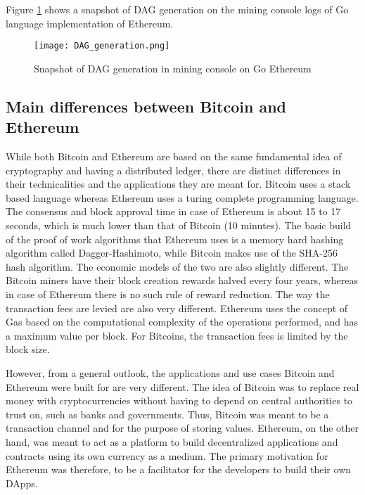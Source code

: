 \documentclass[english]{tktltiki}
\begin{document}
Figure \ref{DAG_generation} shows a snapshot of DAG generation on the mining console logs of Go language implementation of Ethereum.

\begin{figure}[H]
\begin{center}
\texttt{[image: DAG\_generation.png]}
\caption{Snapshot of DAG generation in mining console on Go Ethereum}
\label{DAG_generation}
\end{center}
\end{figure}

\subsection{Main differences between Bitcoin and Ethereum}

While both Bitcoin and Ethereum are based on the same fundamental idea of cryptography and having a distributed ledger, there are distinct differences in their technicalities and the applications they are meant for. Bitcoin uses a stack based language whereas Ethereum uses a turing complete programming language. The consensus and block approval time in case of Ethereum is about 15 to 17 seconds, which is much lower than that of Bitcoin (10 minutes). The basic build of the proof of work algorithms that Ethereum uses is a memory hard hashing algorithm called Dagger-Hashimoto, while Bitcoin makes use of the SHA-256 hash algorithm. The economic models of the two are also slightly different. The Bitcoin miners have their block creation rewards halved every four years, whereas in case of Ethereum there is no such rule of reward reduction. The way the transaction fees are levied are also very different. Ethereum uses the concept of Gas based on the computational complexity of the operations performed, and has a maximum value per block. For Bitcoins, the transaction fees is limited by the block size.

However, from a general outlook, the applications and use cases Bitcoin and Ethereum were built for are very different. The idea of Bitcoin was to replace real money with cryptocurrencies without having to depend on central authorities to trust on, such as banks and governments. Thus, Bitcoin was meant to be a transaction channel and for the purpose of storing values. Ethereum, on the other hand, was meant to act as a platform to build decentralized applications and contracts using its own currency as a medium. The primary motivation for Ethereum was therefore, to be a facilitator for the developers to build their own DApps. 
\end{document}

